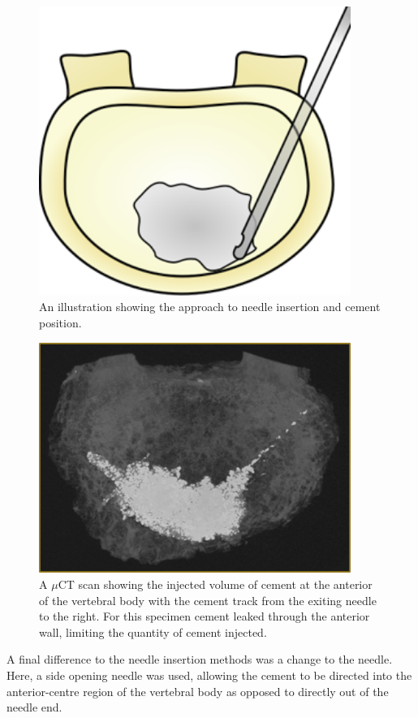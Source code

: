 \begin{figure}[h!]
  \centering
  \includegraphics[width=4in]{Chapters/Chapter_HT_images/vp_illustration.png}
  \caption{An illustration showing the approach to needle insertion and cement position.}
  \label{fig:vp-ill}
\end{figure}


\begin{figure}[h!]
  \centering
  \includegraphics[width=4in]{Chapters/Chapter_HT_images/vp_illustration_scan.png}
  \caption{A $\mu$CT scan showing the injected volume of cement at the anterior of the vertebral body with the cement track from the exiting needle to the right. For this specimen cement leaked through the anterior wall, limiting the quantity of cement injected.}
  \label{fig:vp-ill_scan}
\end{figure}

A final difference to the needle insertion methods was a change to the needle.
Here, a side opening needle was used, allowing the cement to be directed into
the anterior-centre region of the vertebral body as opposed to directly out of
the needle end.

